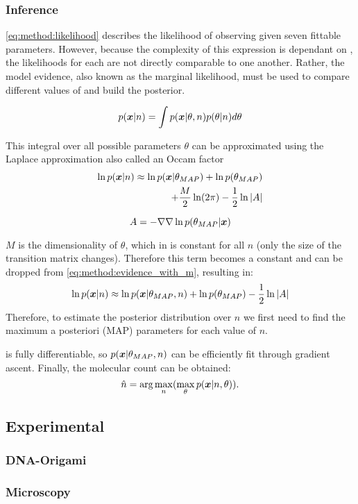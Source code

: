 \subsubsection{Inference}

\eqref{eq:method:likelihood} describes the likelihood of observing \trace given seven fittable parameters.
  However, because the complexity of this expression is dependant on \n, the likelihoods for each \n are not directly comparable to one another.
  Rather, the model evidence, also known as the marginal likelihood, must be used to compare different values of \n and build the posterior. 

  \begin{equation*}
    p(\bm{x} | n) = \int p(\bm{x} | \theta, n) p(\theta | n) d\theta
  \end{equation*}

  This integral over all possible parameters $\theta$ can be approximated using the 
  Laplace approximation also called an Occam factor \cite{bishop_pattern_2006}
  \begin{align*}
    \ln p(\bm{x} | n) \approx \ln p(\bm{x} | \theta_{MAP}) + \ln p(\theta_{MAP}) &\\
    + \frac{M}{2} \ln(2\pi) - \frac{1}{2} \ln |A|
    \label{eq:method:evidence_with_m}
  \end{align*}

  \begin{equation*}
    A = -\nabla \nabla \ln p(\theta_{MAP} | \bm{x})
  \end{equation*}

  $M$ is the dimensionality of $\theta$, which in \ours is constant
  for all $n$ (only the size of the transition matrix changes).
  Therefore this term becomes a constant and can be dropped from 
  \eqref{eq:method:evidence_with_m}, resulting in:
  \begin{equation}
    \ln p(\bm{x} | n) \approx \ln p(\bm{x} | \theta_{MAP}, n) + \ln p(\theta_{MAP}) - \frac{1}{2} \ln |A|
    \label{eq:method:evidence}
  \end{equation}
  Therefore, to estimate the posterior distribution over $n$ we first need to 
  find the maximum a posteriori (MAP) parameters for each value of $n$. 

  \ours is fully differentiable, so $p(\bm{x} | \theta_{MAP}, n)$ can be efficiently 
  fit through gradient ascent.
  Finally, the molecular count can be obtained:
  \begin{equation}
      \hat{n} =
      \text{arg}\max_{n}(
      \max_\theta
      p(\bm{x}|n,\theta))
    \text{.}
    \label{eq:method:optimization}
  \end{equation}

\subsection{Experimental}
\subsubsection{DNA-Origami}
\subsubsection{Microscopy}


